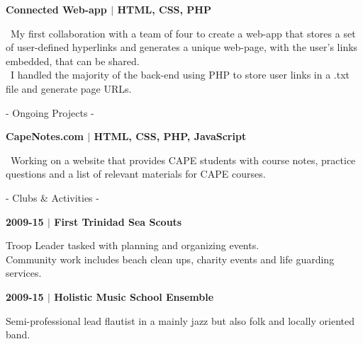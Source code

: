 \documentclass{article}
\begin{document}
\begin{minipage}[t]{0.63\textwidth}
{\sffamily\bf\small {\large Connected Web-app $|$} HTML, CSS, PHP}\par
{\small{}\selectfont\textbullet\ My first collaboration with a team of four to create a web-app that stores a set of user-defined hyperlinks and generates a unique web-page, with the user's links embedded, that can be shared.\\
\textbullet\ I handled the majority of the back-end using PHP to store user links in a .txt file and generate page URLs.}\par
\bigskip

{\LARGE\sc - Ongoing Projects -} \smallskip\par
{\sffamily\bf\small {\large CapeNotes.com $|$} HTML, CSS, PHP, JavaScript}\par
{\small{}\selectfont\textbullet\ Working on a website that provides CAPE students with course notes, practice questions and a list of relevant materials for CAPE courses.}\par
\bigskip

{\LARGE\sc - Clubs \& Activities -} \smallskip\par
{\sffamily\bf 2009-15 $|$ {\large First Trinidad Sea Scouts}}\par
{\selectfont Troop Leader tasked with planning and organizing events.\\
Community work includes beach clean ups, charity events and life guarding services.}\par
{\sffamily\bf 2009-15 $|$ {\large Holistic Music School Ensemble}}\par
{\selectfont Semi-professional lead flautist in a mainly
jazz but also folk and locally oriented band.}\par

\end{minipage}
\end{document}
